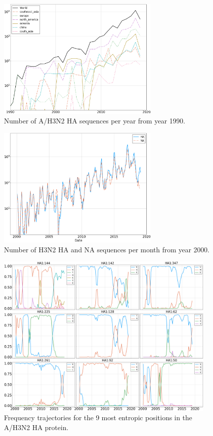 \documentclass[reprint,amsmath,amssymb,superscriptaddress,showpacs,rmp]{revtex4-1}
\begin{document}
	\begin{figure}[h]
		\centering
		\includegraphics[width=0.7\textwidth]{SM_figures/Nseq_per_year.png}
		\caption{Number of A/H3N2 HA sequences per year from year 1990. }
		\label{fig:nseq_per_year}
	\end{figure}
	\begin{figure}[h]
		\centering
		\includegraphics[width=0.7\textwidth]{SM_figures/Nseq_per_month.png}
		\caption{Number of H3N2 HA and NA sequences per month from year 2000. }
		\label{fig:nseq_per_month}
	\end{figure}

	\begin{figure}[h]
		\centering
		\includegraphics[width=0.95\textwidth]{SM_figures/sample_trajectories.png}
		\caption{Frequency trajectories for the 9 most entropic positions in the A/H3N2 HA protein.}
		\label{fig:sample_trajectories}
	\end{figure}
\end{document}

